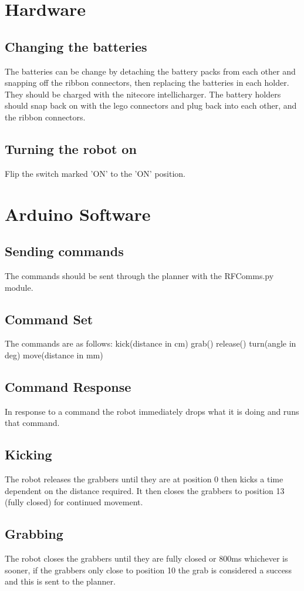 \section{Hardware}
\subsection{Changing the batteries}
The batteries can be change by detaching the battery packs from each other and snapping off the ribbon connectors, then replacing the batteries in each holder. They should be charged with the nitecore intellicharger. The battery holders should snap back on with the lego connectors and plug back into each other, and the ribbon connectors.

\subsection{Turning the robot on}
Flip the switch marked 'ON' to the 'ON' position.

\section{Arduino Software}
\subsection{Sending commands}
The commands should be sent through the planner with the RFComms.py module. 

\subsection{Command Set}
The commands are as follows:
kick(distance in cm)
grab()
release()
turn(angle in deg)
move(distance in mm)
\subsection{Command Response}
In response to a command the robot immediately drops what it is doing and runs that command. 
\subsection{Kicking}
The robot releases the grabbers until they are at position 0 then kicks a time dependent on the distance required. It then closes the grabbers to position 13 (fully closed) for continued movement.
\subsection{Grabbing}
The robot closes the grabbers until they are fully closed or 800ms whichever is sooner, if the grabbers only close to position 10 the grab is considered a success and this is sent to the planner. 
